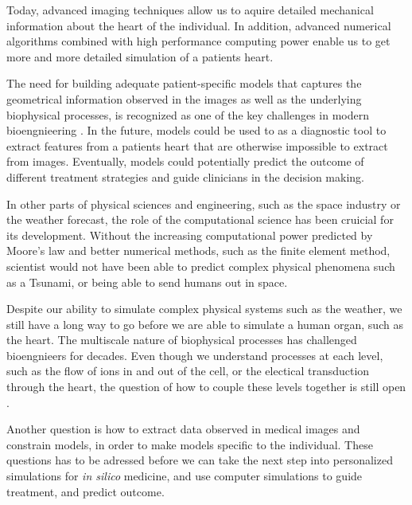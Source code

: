 

Today, advanced imaging techniques allow us to aquire detailed
mechanical information about the heart of the individual. In addition,
advanced numerical algorithms combined with high performance computing
power enable us to get more and more detailed simulation of a patients
heart. 



The need for building adequate patient-specific models that captures
the geometrical information observed in the images as well as the
underlying biophysical processes, is recognized as one of the key
challenges in modern bioengnieering \cite{hunter2010vision}.
In the future, models could be used to as a diagnostic tool to extract
features from a patients heart that are otherwise impossible to extract from
images. Eventually, models could potentially predict the outcome of
different treatment strategies and guide clinicians in the decision making.

In other parts of physical sciences and engineering, such as the
space industry or the weather forecast, the role of the computational
science has been cruicial for its development. Without the increasing
computational power predicted by Moore's law
\cite{brock2006understanding} and better numerical methods, such as the
finite element method, scientist would not have been able to predict
complex physical phenomena such as a Tsunami, or being able to send
humans out in space. 

Despite our ability to simulate complex physical systems such as
the weather, we still have a long way to go before we are able to
simulate a human organ, such as the heart. The multiscale nature of
biophysical processes has challenged bioengnieers for decades.
Even though we understand processes at each level, such as the flow of
ions in and out of the cell, or the electical transduction through the
heart, the question of how to couple these levels together is still open
\cite{noble2002modeling}.

Another question is how to extract data
observed in medical images and constrain models, in order to make
models specific to the individual. These questions has to be adressed
before we can take the next step into personalized simulations for
\emph{in silico} medicine, and use computer simulations to guide
treatment, and predict outcome.


